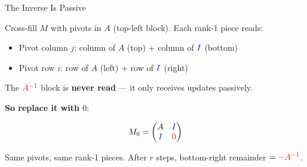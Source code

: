 \documentclass[10pt]{beamer}
\theoremstyle{definition}
\newcommand{\x}[1]{\alert{\textbf{#1}}}
\newcommand{\rd}[1]{{\color{red}#1}}                  %
\newcommand{\bl}[1]{{\color{blue}#1}}                 %
\begin{document}
\begin{frame}{The Inverse Is Passive}

Cross-fill $M$ with pivots in $A$ (top-left block). Each rank-1 piece reads:

\begin{itemize}
\item Pivot column $j$: \; column of $A$ (top) $+$ column of $\bl{I}$ (bottom)
\item Pivot row $i$: \; row of $A$ (left) $+$ row of $\bl{I}$ (right)
\end{itemize}

\vspace{0.3em}

The $\rd{A^{-1}}$ block is \x{never read} — it only receives updates passively.

\vspace{0.5em}

\x{So replace it with $0$}:

$$M_0 = \begin{pmatrix} A & \bl{I} \\ \bl{I} & \rd{0} \end{pmatrix}$$

Same pivots, same rank-1 pieces. After $r$ steps, bottom-right remainder $= \rd{-A^{-1}}$.

\end{frame}
\end{document}
